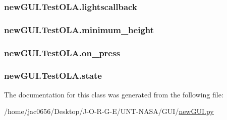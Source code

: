 \subsubsection[{\texorpdfstring{lightscallback}{lightscallback}}]{\setlength{\rightskip}{0pt plus 5cm}new\+G\+U\+I.\+Test\+O\+L\+A.\+lightscallback\hspace{0.3cm}{\ttfamily [static]}}\hypertarget{classnewGUI_1_1TestOLA_aa24180876456f19c35ec3c19b249d099}{}\label{classnewGUI_1_1TestOLA_aa24180876456f19c35ec3c19b249d099}
\subsubsection[{\texorpdfstring{minimum\+\_\+height}{minimum_height}}]{\setlength{\rightskip}{0pt plus 5cm}new\+G\+U\+I.\+Test\+O\+L\+A.\+minimum\+\_\+height\hspace{0.3cm}{\ttfamily [static]}}\hypertarget{classnewGUI_1_1TestOLA_a6d3d283da39e5c797ac7afb5f3afebce}{}\label{classnewGUI_1_1TestOLA_a6d3d283da39e5c797ac7afb5f3afebce}
\subsubsection[{\texorpdfstring{on\+\_\+press}{on_press}}]{\setlength{\rightskip}{0pt plus 5cm}new\+G\+U\+I.\+Test\+O\+L\+A.\+on\+\_\+press\hspace{0.3cm}{\ttfamily [static]}}\hypertarget{classnewGUI_1_1TestOLA_aba30a8c672bbb3cad0b58269a6beea66}{}\label{classnewGUI_1_1TestOLA_aba30a8c672bbb3cad0b58269a6beea66}
\subsubsection[{\texorpdfstring{state}{state}}]{\setlength{\rightskip}{0pt plus 5cm}new\+G\+U\+I.\+Test\+O\+L\+A.\+state\hspace{0.3cm}{\ttfamily [static]}}\hypertarget{classnewGUI_1_1TestOLA_a145719e15cfbd7221900dc9774f2de64}{}\label{classnewGUI_1_1TestOLA_a145719e15cfbd7221900dc9774f2de64}


The documentation for this class was generated from the following file\+:\begin{DoxyCompactItemize}
\item 
/home/jac0656/\+Desktop/\+J-\/\+O-\/\+R-\/\+G-\/\+E/\+U\+N\+T-\/\+N\+A\+S\+A/\+G\+U\+I/\hyperlink{newGUI_8py}{new\+G\+U\+I.\+py}\end{DoxyCompactItemize}
